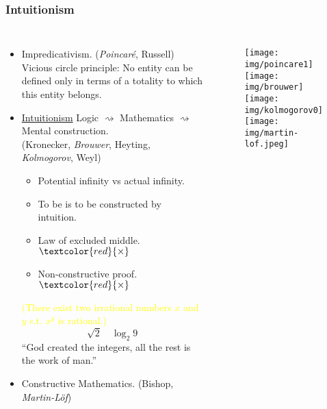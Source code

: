 \documentclass[UTF8,aspectratio=43,11pt,colorlinks,compress,openany]{beamer}%
\begin{document}
\begin{frame}\frametitle{Intuitionism}
\begin{columns}
\vspace*{-5ex}
	\begin{itemize}
		\item Impredicativism. (\emph{Poincar\'e}, Russell)\\
		Vicious circle principle: \small{No entity can be defined only in terms of a totality to which this entity belongs.}
		\item \colorbox{green!30}{\underline{Intuitionism}} Logic $\rightsquigarrow$ Mathematics $\rightsquigarrow$ Mental construction.\\
		(Kronecker, \emph{Brouwer}, Heyting, \emph{Kolmogorov}, Weyl)\\
		\begin{itemize}
		\item Potential infinity vs actual infinity.
		\item To be is to be constructed by intuition.
		\item Law of excluded middle.$\textcolor{red}{\times}$
		\item Non-constructive proof.$\textcolor{red}{\times}$
		\end{itemize}
		\textcolor{yellow}{(There exist two irrational numbers $x$ and $y$ s.t. $x^y$ is rational.)}
		\[\sqrt{2}\quad \log_2 9\]
		``God created the integers, all the rest is the work of man.''\\
		\item Constructive Mathematics. (Bishop, \emph{Martin-L\"of})
	\end{itemize}
\vspace*{-2ex}
\begin{figure}
	\texttt{[image: img/poincare1]}\\
	\texttt{[image: img/brouwer]}\\
	\texttt{[image: img/kolmogorov0]}\\
	\texttt{[image: img/martin-lof.jpeg]}
\end{figure}
\end{columns}
\end{frame}
\end{document}

